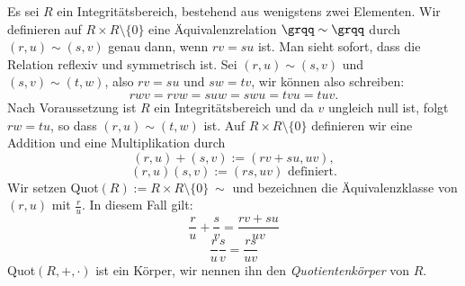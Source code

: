 \begin{satz}\label{quotkoerper} %
Es sei $R$ ein Integritätsbereich, bestehend aus wenigstens zwei Elementen. Wir definieren auf $R\times R\setminus\lbrace 0\rbrace$ eine Äquivalenzrelation $\grqq\sim\grqq$ durch $\left(r,u\right) \sim \left(s, v\right)$ genau dann, wenn $rv = su$ ist. Man sieht sofort, dass die Relation reflexiv und symmetrisch ist. Sei $\left(r,u\right) \sim \left(s, v\right)$ und $ \left(s, v\right) \sim \left(t, w\right) $, also $rv = su$ und $sw = tv$, wir können also schreiben: \\
\[rwv = rvw = suw = swu = tvu = tuv.\]
Nach Voraussetzung ist $R$ ein Integritätsbereich und da $v$ ungleich null ist, folgt $rw = tu$, so dass $\left(r,u \right) \sim \left(t, w\right)$ ist. Auf $R\times R\setminus \lbrace 0\rbrace$ definieren wir eine Addition und eine Multiplikation durch 
\[\left(r,u\right)+ \left(s,v\right) := \left(rv + su, uv\right),\]
\[\left(r,u\right)\left(s,v\right) := \left(rs, uv\right)\text{ definiert.}\] 
Wir setzen \textup{Quot}$(R) := R\times R\setminus\lbrace 0\rbrace \ \sim$ und bezeichnen die Äquivalenzklasse von $(r,u) $ mit $\frac{r}{u}$. In diesem Fall gilt: 
\[\frac{r}{u} + \frac{s}{v} = \frac{rv + su}{uv}\]
\[\frac{r}{u}\frac{s}{v} = \frac{rs}{uv}\]
\textup{Quot}$\left(R, +, \cdot\right)$ ist ein Körper, wir nennen ihn den \textit{Quotientenkörper} von $R$.
\end{satz}
